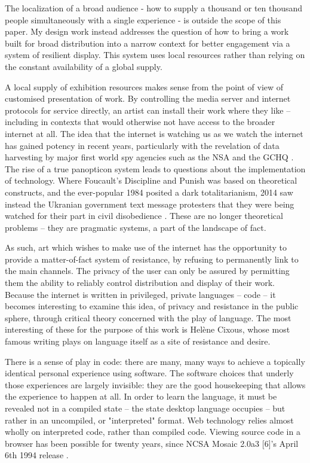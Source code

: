 The localization of a broad audience - how to supply a thousand or ten thousand people simultaneously with a single experience - is outside the scope of this paper. My design work instead addresses the question of how to bring a work built for broad distribution into a narrow context for better engagement via a system of resilient display. This system uses local resources rather than relying on the constant availability of a global supply.

A local supply of exhibition resources makes sense from the point of view of customised presentation of work. By controlling the media server and internet protocols for service directly, an artist can install their work where they like – including in contexts that would otherwise not have access to the broader internet at all. The idea that the internet is watching us as we watch the internet has gained potency in recent years, particularly with the revelation of data harvesting by major first world spy agencies such as the NSA and the GCHQ \parencite{guardiangchq}. The rise of a true panopticon system leads to questions about the implementation of technology. Where Foucault's Discipline and Punish was based on theoretical constructs, and the ever-popular 1984 posited a dark totalitarianism, 2014 saw instead the Ukranian government text message protesters that they were being watched for their part in civil disobedience \parencite{viceukraine}. These are no longer theoretical problems – they are pragmatic systems, a part of the landscape of fact.

As such, art which wishes to make use of the internet has the opportunity to provide a matter-of-fact system of resistance, by refusing to permanently link to the main channels. The privacy of the user can only be assured by permitting them the ability to reliably control distribution and display of their work. Because the internet is written in privileged, private languages – code – it becomes interesting to examine this idea, of privacy and resistance in the public sphere, through critical theory concerned with the play of language. The most interesting of these for the purpose of this work is Helène Cixous, whose most famous writing plays on language itself as a site of resistance and desire.

There is a sense of play in code: there are many, many ways to achieve a topically identical personal experience using software. The software choices that underly those experiences are largely invisible: they are the good housekeeping that allows the experience to happen at all. In order to learn the language, it must be revealed not in a compiled state – the state desktop language occupies – but rather in an uncompiled, or "interpreted" format. Web technology relies almost wholly on interpreted code, rather than compiled code. Viewing source code in a browser has been possible for twenty years, since NCSA Mosaic 2.0a3 [6]'s April 6th 1994 release \parencite{mosaic}.

